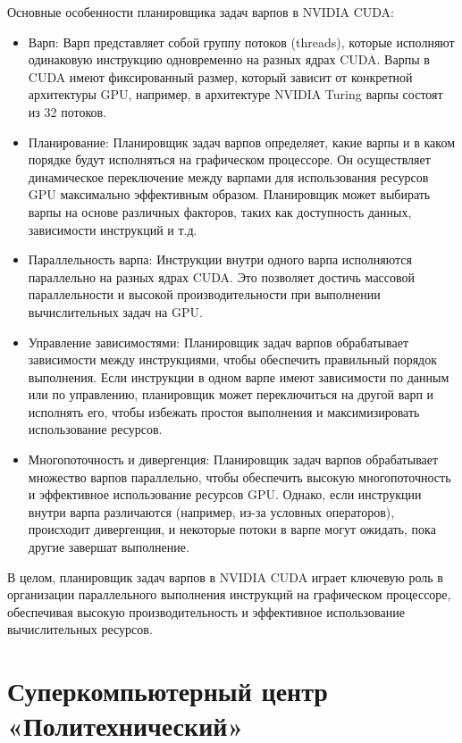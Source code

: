 \documentclass[a4paper, 12pt]{article}
\begin{document}
    Основные особенности планировщика задач варпов в NVIDIA CUDA:
    \begin{itemize}
    \item Варп: Варп представляет собой группу потоков (threads), которые исполняют одинаковую инструкцию одновременно на разных ядрах CUDA. Варпы в CUDA имеют фиксированный размер, который зависит от конкретной архитектуры GPU, например, в архитектуре NVIDIA Turing варпы состоят из 32 потоков.
    \item Планирование: Планировщик задач варпов определяет, какие варпы и в каком порядке будут исполняться на графическом процессоре. Он осуществляет динамическое переключение между варпами для использования ресурсов GPU максимально эффективным образом. Планировщик может выбирать варпы на основе различных факторов, таких как доступность данных, зависимости инструкций и т.д.
    \item Параллельность варпа: Инструкции внутри одного варпа исполняются параллельно на разных ядрах CUDA. Это позволяет достичь массовой параллельности и высокой производительности при выполнении вычислительных задач на GPU.
    \item Управление зависимостями: Планировщик задач варпов обрабатывает зависимости между инструкциями, чтобы обеспечить правильный порядок выполнения. Если инструкции в одном варпе имеют зависимости по данным или по управлению, планировщик может переключиться на другой варп и исполнять его, чтобы избежать простоя выполнения и максимизировать использование ресурсов.
    \item Многопоточность и дивергенция: Планировщик задач варпов обрабатывает множество варпов параллельно, чтобы обеспечить высокую многопоточность и эффективное использование ресурсов GPU. Однако, если инструкции внутри варпа различаются (например, из-за условных операторов), происходит дивергенция, и некоторые потоки в варпе могут ожидать, пока другие завершат выполнение.
    \end{itemize}
    
    В целом, планировщик задач варпов в NVIDIA CUDA играет ключевую роль в организации параллельного выполнения инструкций на графическом процессоре, обеспечивая высокую производительность и эффективное использование вычислительных ресурсов.


    \newpage
    \section{Суперкомпьютерный центр «Политехнический»}
\end{document}
